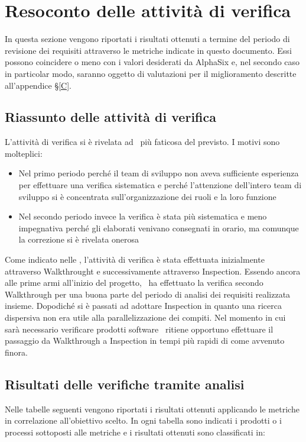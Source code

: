 \newpage
\section{Resoconto delle attività di verifica}
In questa sezione vengono riportati i risultati ottenuti a termine del periodo di revisione dei requisiti attraverso le metriche indicate in questo documento. Essi possono coincidere o meno con i valori desiderati da AlphaSix e, nel secondo caso in particolar modo, saranno oggetto di valutazioni per il miglioramento descritte all'appendice \S\ref{C}.

    \subsection{Riassunto delle attività di verifica}
    L'attività di verifica si è rivelata ad \gruppo\ più faticosa del previsto. I motivi sono molteplici:
    	\begin{itemize}
    		\item Nel primo periodo perché il team di sviluppo non aveva sufficiente esperienza per effettuare una verifica sistematica e perché l'attenzione dell'intero team di sviluppo si è concentrata sull'organizzazione dei ruoli e la loro funzione
    		\item Nel secondo periodo invece la verifica è stata più sistematica e meno impegnativa perché gli elaborati venivano consegnati in orario, ma comunque la correzione si è rivelata onerosa
    	\end{itemize}
    

    Come indicato nelle \NdPd, l'attività di verifica è stata effettuata inizialmente attraverso Walkthrought e successivamente attraverso Inspection. Essendo ancora alle prime armi all'inizio del progetto, \gruppo\ ha effettuato la verifica secondo Walkthrough per una buona parte del periodo di analisi dei requisiti realizzata insieme. Dopodiché si è passati ad adottare Inspection in quanto una ricerca dispersiva non era utile alla parallelizzazione dei compiti. 
    Nel momento in cui sarà necessario verificare prodotti software \gruppo\ ritiene opportuno effettuare il passaggio da Walkthrough a Inspection in tempi più rapidi di come avvenuto finora.
    
    \subsection{Risultati delle verifiche tramite analisi}
    Nelle tabelle seguenti vengono riportati i risultati ottenuti applicando le metriche in correlazione all'obiettivo scelto. 
    In ogni tabella sono indicati i prodotti o i processi sottoposti alle metriche e i risultati ottenuti sono classificati in:
    
